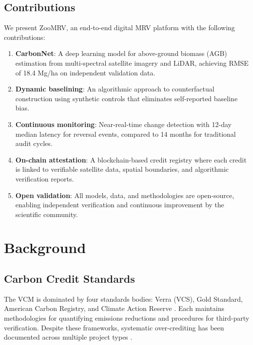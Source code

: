 \documentclass[11pt,a4paper]{article}
\begin{document}
\subsection{Contributions}

We present ZooMRV, an end-to-end digital MRV platform with the following
contributions:

\begin{enumerate}
  \item \textbf{CarbonNet}: A deep learning model for above-ground
    biomass (AGB) estimation from multi-spectral satellite imagery and
    LiDAR, achieving RMSE of 18.4 Mg/ha on independent validation data.

  \item \textbf{Dynamic baselining}: An algorithmic approach to
    counterfactual construction using synthetic controls
    \citep{abadie2010synthetic} that eliminates self-reported baseline
    bias.

  \item \textbf{Continuous monitoring}: Near-real-time change detection
    with 12-day median latency for reversal events, compared to 14
    months for traditional audit cycles.

  \item \textbf{On-chain attestation}: A blockchain-based credit
    registry where each credit is linked to verifiable satellite data,
    spatial boundaries, and algorithmic verification reports.

  \item \textbf{Open validation}: All models, data, and methodologies
    are open-source, enabling independent verification and continuous
    improvement by the scientific community.
\end{enumerate}


\section{Background}
\label{sec:background}

\subsection{Carbon Credit Standards}

The VCM is dominated by four standards bodies: Verra (VCS), Gold
Standard, American Carbon Registry, and Climate Action Reserve
\citep{schneider2019double}. Each maintains methodologies for
quantifying emissions reductions and procedures for third-party
verification. Despite these frameworks, systematic over-crediting has
been documented across multiple project types \citep{badgley2022,
west2023action}.
\end{document}
